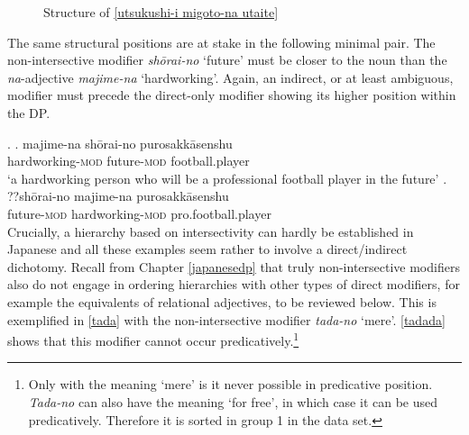 \begin{figure}
\centering
{}
\caption{Structure of \ref{utsukushi-i migoto-na utaite}}
\label{Structure of utsukushi-i migoto-na utaite}
\end{figure}

The same structural positions are at stake in the following minimal pair. The non-intersective modifier \textit{shōrai-no} `future' must be closer to the noun than the \textit{na}-adjective \textit{majime-na} `hardworking'. Again, an indirect, or at least ambiguous, modifier must precede the direct-only modifier showing its higher position within the DP.

\ex. \ag. majime-na shōrai-no purosakkāsenshu\\
hardworking-\textsc{mod} future-\textsc{mod} football.player\\
`a hardworking person who will be a professional football player in the future’
\bg. ??shōrai-no majime-na purosakkāsenshu\\
future-\textsc{mod} hardworking-\textsc{mod} pro.football.player\\

Crucially, a hierarchy based on intersectivity can hardly be established in Japanese and all these examples seem rather to involve a direct/indirect dichotomy. Recall from Chapter \ref{japanesedp} that truly non-intersective modifiers also do not engage in ordering hierarchies with other types of direct modifiers, for example the equivalents of relational adjectives, to be reviewed below. This is exemplified in \ref{tada} with the non-intersective modifier \textit{tada-no} `mere’. \ref{tadada} shows that this modifier cannot occur predicatively.\footnote{Only with the meaning `mere’ is it never possible in predicative position. \textit{Tada-no} can also have the meaning `for free’, in which case it can be used predicatively. Therefore it is sorted in group 1 in the data set.}

